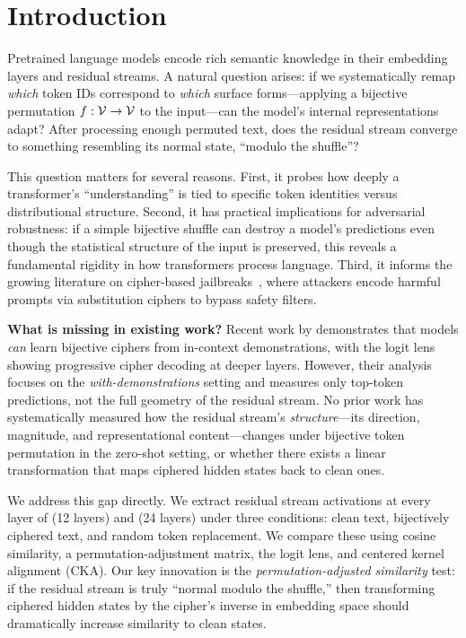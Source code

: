 \section{Introduction}
\label{sec:intro}

Pretrained language models encode rich semantic knowledge in their embedding layers and residual streams. A natural question arises: if we systematically remap \emph{which} token IDs correspond to \emph{which} surface forms---applying a bijective permutation $f: \mathcal{V} \to \mathcal{V}$ to the input---can the model's internal representations adapt? After processing enough permuted text, does the residual stream converge to something resembling its normal state, ``modulo the shuffle''?

This question matters for several reasons. First, it probes how deeply a transformer's ``understanding'' is tied to specific token identities versus distributional structure. Second, it has practical implications for adversarial robustness: if a simple bijective shuffle can destroy a model's predictions even though the statistical structure of the input is preserved, this reveals a fundamental rigidity in how transformers process language. Third, it informs the growing literature on cipher-based jailbreaks~\citep{yuan2023gpt4cipher}, where attackers encode harmful prompts via substitution ciphers to bypass safety filters.

{\bf What is missing in existing work?} Recent work by \citet{fang2025iclciphers} demonstrates that models \emph{can} learn bijective ciphers from in-context demonstrations, with the logit lens showing progressive cipher decoding at deeper layers. However, their analysis focuses on the \emph{with-demonstrations} setting and measures only top-token predictions, not the full geometry of the residual stream. No prior work has systematically measured how the residual stream's \emph{structure}---its direction, magnitude, and representational content---changes under bijective token permutation in the zero-shot setting, or whether there exists a linear transformation that maps ciphered hidden states back to clean ones.

We address this gap directly. We extract residual stream activations at every layer of \gpttwo (12 layers) and \pythia (24 layers) under three conditions: clean text, bijectively ciphered text, and random token replacement. We compare these using cosine similarity, a permutation-adjustment matrix, the logit lens, and centered kernel alignment (CKA). Our key innovation is the \emph{permutation-adjusted similarity} test: if the residual stream is truly ``normal modulo the shuffle,'' then transforming ciphered hidden states by the cipher's inverse in embedding space should dramatically increase similarity to clean states.

